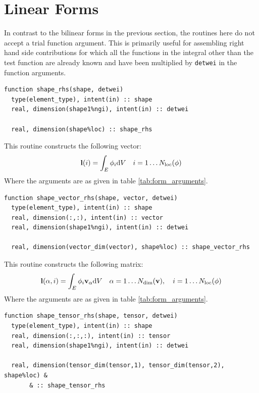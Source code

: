 \documentclass[a4paper, 11pt]{book}
\begin{document}
\section{Linear Forms}

In contrast to the bilinear forms in the previous section, the routines here
do not accept a trial function argument. This is primarily useful for
assembling right hand side contributions for which all the functions in the
integral other than the test function are already known and have been
multiplied by \lstinline+detwei+ in the function arguments.


\begin{lstlisting}
function shape_rhs(shape, detwei)
  type(element_type), intent(in) :: shape
  real, dimension(shape1%ngi), intent(in) :: detwei

  real, dimension(shape%loc) :: shape_rhs
\end{lstlisting}

This routine constructs the following vector:
\begin{equation}
  \mathbf{l}(i)=\int_E \phi_{i}\mathrm{d} V\quad
  i=1\ldots N_\mathrm{loc}(\phi)
\end{equation}
Where the arguments are as given in table \ref{tab:form_arguments}. 



\begin{lstlisting}
function shape_vector_rhs(shape, vector, detwei)
  type(element_type), intent(in) :: shape
  real, dimension(:,:), intent(in) :: vector
  real, dimension(shape1%ngi), intent(in) :: detwei

  real, dimension(vector_dim(vector), shape%loc) :: shape_vector_rhs
\end{lstlisting}

This routine constructs the following matrix:
\begin{equation}
  \mathbf{l}(\alpha, i)=\int_E \phi_{i}\mathbf{v}_\alpha\mathrm{d} V\quad
  \alpha=1\ldots N_\mathrm{dim}(\mathbf{v}),\quad i=1\ldots N_\mathrm{loc}(\phi)
\end{equation}
Where the arguments are as given in table \ref{tab:form_arguments}. 



\begin{lstlisting}
function shape_tensor_rhs(shape, tensor, detwei)
  type(element_type), intent(in) :: shape
  real, dimension(:,:,:), intent(in) :: tensor
  real, dimension(shape1%ngi), intent(in) :: detwei

  real, dimension(tensor_dim(tensor,1), tensor_dim(tensor,2), shape%loc) &
       & :: shape_tensor_rhs
\end{lstlisting}
\end{document}
